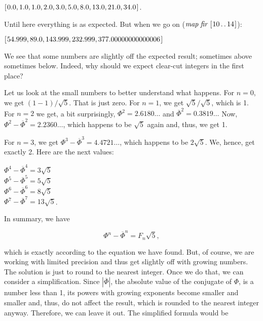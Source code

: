\documentclass[tikz]{scrreprt}
\newcommand{\Varid}[1]{\mathit{#1}}
\begin{document}
\ensuremath{[\mskip1.5mu \mathrm{0.0},\mathrm{1.0},\mathrm{1.0},\mathrm{2.0},\mathrm{3.0},\mathrm{5.0},\mathrm{8.0},\mathrm{13.0},\mathrm{21.0},\mathrm{34.0}\mskip1.5mu]}.

Until here everything is as expected.
But when we go on (\ensuremath{\Varid{map}\;\Varid{fir}\;[\mskip1.5mu \mathrm{10}\mathinner{\ldotp\ldotp}\mathrm{14}\mskip1.5mu]}):

\ensuremath{[\mskip1.5mu \mathrm{54.999},\mathrm{89.0},\mathrm{143.999},\mathrm{232.999},\mathrm{377.00000000000006}\mskip1.5mu]}

We see that some numbers are slightly off
the expected result; sometimes above sometimes
below. Indeed, why should we expect clear-cut
integers in the first place?

Let us look at the small numbers to better understand
what happens. For $n=0$, we get $(1-1)/\sqrt{5}$.
That is just zero. For $n=1$, we get $\sqrt{5}/\sqrt{5}$,
which is 1. For $n=2$ we get, a bit surprisingly,
$\Phi^2 = 2.6180\dots$ and
$\overline{\Phi}^2 = 0.3819\dots$
Now, $\Phi^2 - \overline{\Phi}^2 = 2.2360\dots$,
which happens to be $\sqrt{5}$ again and, thus,
we get 1.

For $n=3$, we get
$\Phi^3 - \overline{\Phi}^3 = 4.4721\dots$,
which happens to be $2\sqrt{5}$. We, hence, get exactly 2.
Here are the next values:

$\Phi^4 - \overline{\Phi}^4 = 3\sqrt{5}$\\
$\Phi^5 - \overline{\Phi}^5 = 5\sqrt{5}$\\
$\Phi^6 - \overline{\Phi}^6 = 8\sqrt{5}$\\
$\Phi^7 - \overline{\Phi}^7 = 13\sqrt{5}$.

In summary, we have

\begin{equation}
\Phi^n - \overline{\Phi}^n = F_n\sqrt{5},
\end{equation}

which is exactly according to the equation
we have found.
But, of course, we are working with limited precision
and thus get slightly off with growing numbers.
The solution is just to round to the nearest integer.
Once we do that, we can consider a simplification.
Since $|\overline{\Phi}|$, the absolute value
of the conjugate of $\Phi$, is a number less than 1,
its powers with growing exponents become smaller and
smaller and, thus, do not affect the result, which is
rounded to the nearest integer anyway.
Therefore, we can leave it out. 
The simplified formula would be
\end{document}
